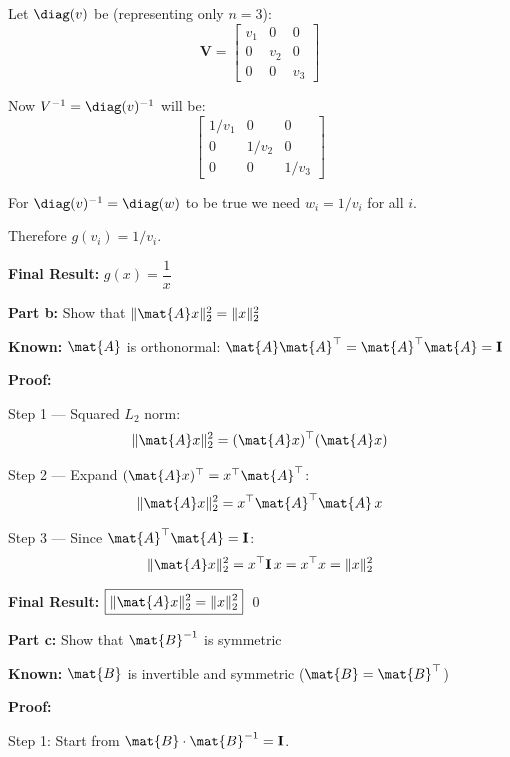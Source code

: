 \documentclass{article}
\begin{document}
\begin{aprob}
    \medskip
    Let $\diag(v)$ be (representing only $n=3$):
    \[
        \mathbf{V} = \begin{bmatrix} v_{1} & 0 & 0 \\ 0 & v_{2} & 0 \\ 0 & 0 & v_{3} \end{bmatrix}
    \]

    Now $V^{-1} = \diag(v)^{-1}$ will be:
    \[
        \begin{bmatrix} 1/v_{1} & 0 & 0 \\ 0 & 1/v_{2} & 0 \\ 0 & 0 & 1/v_{3} \end{bmatrix}
    \]

    For $\diag(v)^{-1} = \diag(w)$ to be true we need $w_i = 1/v_i$ for all $i$.

    Therefore $g(v_i) = 1/v_i$.

    \medskip
    \textbf{Final Result:} $\boxed{g(x) = \dfrac{1}{x}}$

    \bigskip
    \begin{mdframed}
    \textbf{\large Part b:} Show that $\|\mat{A}x\|_2^2 = \|x\|_2^2$
    \end{mdframed}

    \textbf{Known:} $\mat{A}$ is orthonormal: $\mat{A}\mat{A}^\top = \mat{A}^\top\mat{A} = \mathbf{I}$

    \medskip
    \textbf{Proof:}

    Step 1 --- Squared $L_2$ norm:
    \[
        \|\mat{A}x\|_2^2 = (\mat{A}x)^\top(\mat{A}x)
    \]

    Step 2 --- Expand $(\mat{A}x)^\top = x^\top \mat{A}^\top$:
    \[
        \|\mat{A}x\|_2^2 = x^\top \mat{A}^\top \mat{A}\, x
    \]

    Step 3 --- Since $\mat{A}^\top \mat{A} = \mathbf{I}$:
    \[
        \|\mat{A}x\|_2^2 = x^\top \mathbf{I}\, x = x^\top x = \|x\|_2^2
    \]

    \textbf{Final Result:} $\boxed{\|\mat{A}x\|_2^2 = \|x\|_2^2}$ \qed

    \bigskip
    \begin{mdframed}
    \textbf{\large Part c:} Show that $\mat{B}^{-1}$ is symmetric
    \end{mdframed}

    \textbf{Known:} $\mat{B}$ is invertible and symmetric ($\mat{B} = \mat{B}^\top$)

    \medskip
    \textbf{Proof:}

    Step 1: Start from $\mat{B} \cdot \mat{B}^{-1} = \mathbf{I}$.


\end{aprob}
\end{document}
